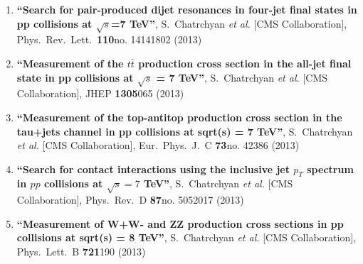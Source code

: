 \begin{enumerate}
\item%
{\bf ``Search for pair-produced dijet resonances in four-jet final states in pp collisions at $\sqrt{s}$=7 TeV''}, 
  S.~Chatrchyan {\it et al.}  [CMS Collaboration], 
Phys.\ Rev.\ Lett.\  {\bf 110}no. 14141802 (2013) %


\item%
{\bf ``Measurement of the $t\bar{t}$ production cross section in the all-jet final state in pp collisions at $\sqrt{s}$ = 7 TeV''}, 
  S.~Chatrchyan {\it et al.}  [CMS Collaboration], 
JHEP {\bf 1305}065 (2013) %


\item%
{\bf ``Measurement of the top-antitop production cross section in the tau+jets channel in pp collisions at sqrt(s) = 7 TeV''}, 
  S.~Chatrchyan {\it et al.}  [CMS Collaboration], 
Eur.\ Phys.\ J.\ C {\bf 73}no. 42386 (2013) %


\item%
{\bf ``Search for contact interactions using the inclusive jet $p_T$ spectrum in $pp$ collisions at $\sqrt{s} = 7$ TeV''}, 
  S.~Chatrchyan {\it et al.}  [CMS Collaboration], 
Phys.\ Rev.\ D {\bf 87}no. 5052017 (2013) %


\item%
{\bf ``Measurement of W+W- and ZZ production cross sections in pp collisions at sqrt(s) = 8 TeV''}, 
  S.~Chatrchyan {\it et al.}  [CMS Collaboration], 
Phys.\ Lett.\ B {\bf 721}190 (2013) %



\end{enumerate}
